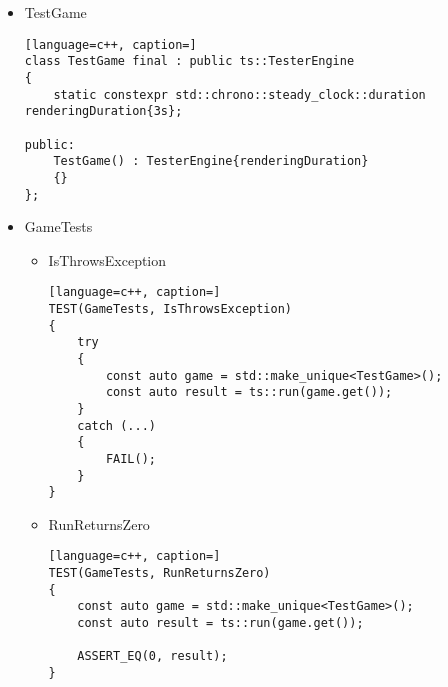 \begin{itemize}
\begin{itemize}
\begin{lstlisting}[language=c++, caption=]
    const ts::math::Vec3 axis{0.f, 1.f, 0.f};
    const auto result = ts::math::rotate(matrix, axis, ts::math::radians(180.f));

    const ts::math::Mat4 expected
    {
        -1.f, +0.f, +0.f, +0.f,
        +0.f, +1.f, +0.f, +0.f,
        +0.f, +0.f, -1.f, +0.f,
        +0.f, +0.f, +0.f, +1.f,
    };
    ASSERT_TRUE(expected[0].x == result[0].x and expected[1].y == result[1].y and expected[2].z == result[2].z);
}
            \end{lstlisting}
        \end{itemize}
    \item TestGame
        \begin{lstlisting}[language=c++, caption=]
class TestGame final : public ts::TesterEngine
{
    static constexpr std::chrono::steady_clock::duration renderingDuration{3s};

public:
    TestGame() : TesterEngine{renderingDuration}
    {}
};
        \end{lstlisting}
    \item GameTests
        \begin{itemize}
            \item IsThrowsException
            \begin{lstlisting}[language=c++, caption=]
TEST(GameTests, IsThrowsException)
{
    try
    {
        const auto game = std::make_unique<TestGame>();
        const auto result = ts::run(game.get());
    }
    catch (...)
    {
        FAIL();
    }
}
            \end{lstlisting}
            \item RunReturnsZero
            \begin{lstlisting}[language=c++, caption=]
TEST(GameTests, RunReturnsZero)
{
    const auto game = std::make_unique<TestGame>();
    const auto result = ts::run(game.get());

    ASSERT_EQ(0, result);
}
            \end{lstlisting}
        \end{itemize}
\end{itemize}